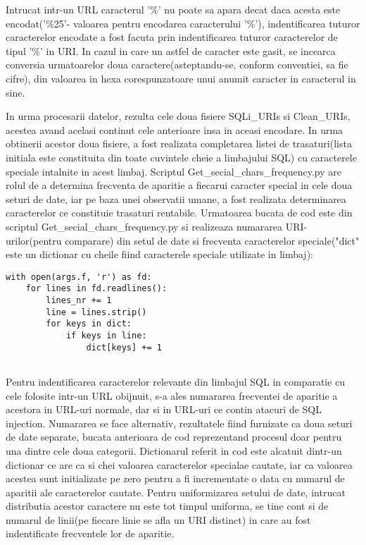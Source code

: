 Intrucat intr-un URL caracterul '\%' nu poate sa apara decat daca acesta este encodat('\%25'- valoarea pentru encodarea caracterului '\%'), indentificarea tuturor caracterelor encodate a fost facuta prin indentificarea tuturor caracterelor de tipul '\%' in URI. In cazul in care un astfel de caracter este gasit, se incearca conversia urmatoarelor doua caractere(asteptandu-se, conform conventiei, sa fie cifre), din valoarea in hexa corespunzatoare unui anumit caracter in caracterul in sine.


In urma procesarii datelor, rezulta cele doua fisiere SQLi\_URIs si Clean\_URIs, acestea avand acelasi continut cele anterioare insa in aceasi encodare. In urma obtinerii acestor doua fisiere, a fost realizata completarea listei de trasaturi(lista initiala este constituita din toate cuvintele cheie a limbajului SQL) cu caracterele speciale intalnite in acest limbaj. Scriptul Get\_secial\_chars\_frequency.py are rolul de a determina frecventa de aparitie a fiecarui caracter special in cele doua seturi de date, iar pe baza unei observatii umane, a fost realizata determinarea caracterelor ce constituie trasaturi rentabile. Urmatoarea bucata de cod este din scriptul Get\_secial\_chars\_frequency.py si realizeaza numararea URI-urilor(pentru comparare) din setul de date si frecventa caracterelor speciale("dict" este un dictionar cu cheile fiind caracterele speciale utilizate in limbaj):
\lstset{language=python,frame=single, showstringspaces=false}
\begin{lstlisting}
with open(args.f, 'r') as fd:
    for lines in fd.readlines():
        lines_nr += 1
        line = lines.strip()
        for keys in dict:
            if keys in line:
                dict[keys] += 1
                
\end{lstlisting}

Pentru indentificarea caracterelor relevante din limbajul SQL in comparatie cu cele folosite intr-un URL obijnuit, s-a ales numararea frecventei de aparitie a acestora in URL-uri normale, dar si in URL-uri ce contin atacuri de SQL injection. Numararea se face alternativ, rezultatele fiind furnizate ca doua seturi de date separate, bucata anterioara de cod reprezentand procesul doar pentru una dintre cele doua categorii. Dictionarul referit in cod este alcatuit dintr-un dictionar ce are ca si chei valoarea caracterelor specialae cautate, iar ca valoarea acestea sunt initializate pe zero pentru a fi incrementate o data cu numarul de aparitii ale caracterelor cautate. Pentru uniformizarea setului de date, intrucat distributia acestor caractere nu este tot timpul uniforma, se tine cont si de numarul de linii(pe fiecare linie se afla un URI distinct) in care au fost indentificate frecventele lor de aparitie.

